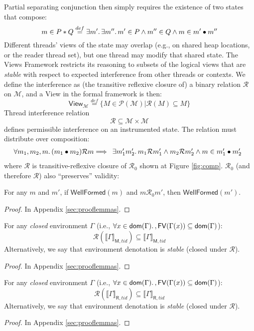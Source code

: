 Partial separating conjunction then simply requires the existence of two states that compose:
\[ m \in P \ast Q   \stackrel{def}{=} \exists m' \ldotp \exists m'' \ldotp m' \in P \land m'' \in Q \land m \in m' \bullet m''\]
Different threads' views of the state may overlap (e.g., on shared heap locations, or the reader thread set), but one thread may modify that shared state.  The Views Framework restricts its reasoning to subsets of the logical views that are \emph{stable} with respect to expected interference from other threads or contexts.  We define the interference as (the transitive reflexive closure of) a binary relation $\mathcal{R}$ on $\mathcal{M}$, and a \textsf{View} in the formal framework is then:
\[\textsf{View}_{\mathcal{M}} \stackrel{def}{=} \{ M \in \mathcal{P}(\mathcal{M}) | \mathcal{R}(M) \subseteq M\}\]
Thread interference relation
\[\mathcal{R} \subseteq \mathcal{M} \times \mathcal{M}\]  defines permissible interference on an instrumented state. The relation must distribute over composition:
\[ \forall m_{1}, m_{2}, m\ldotp (m_{1} \bullet  m_{2})\mathcal{R}m \Longrightarrow \begin{array}{ll}  \exists  m'_{1} m'_{2} \ldotp m_{1} \mathcal{R} m'_{1} \land m_{2} \mathcal{R} m'_{2} \land  m \in m'_{1} \bullet m'_{2} \end{array}\]
where $\mathcal{R}$ is transitive-reflexive closure of $\mathcal{R}_{0}$ shown at Figure \ref{fig:comp}. $\mathcal{R}_0$ (and therefore $\mathcal{R}$) also ``preserves'' validity:
\begin{lemma}
For any $m$ and $m'$, if $\mathsf{WellFormed}(m)$ and $m\mathcal{R}_0m'$, then $\mathsf{WellFormed}(m')$.
\end{lemma}
\begin{proof}
In Appendix \ref{sec:prooflemmas}.
\end{proof}
\begin{lemma}\label{lemma:stblw}
For any \emph{closed} environment $\Gamma$ (i.e., $\forall x\in\mathsf{dom}(\Gamma)\ldotp, \mathsf{FV}(\Gamma(x))\subseteq\mathsf{dom}(\Gamma)$):
\[
\mathcal{R}(\llbracket\Gamma\rrbracket_{\mathsf{M},tid})\subseteq\llbracket\Gamma\rrbracket_{\mathsf{M},tid}
\]
Alternatively, we say that environment denotation is \emph{stable} (closed under $\mathcal{R}$).
\end{lemma}
\begin{proof}
In Appendix \ref{sec:prooflemmas}.
\end{proof}
\begin{lemma}
For any \emph{closed} environment $\Gamma$ (i.e., $\forall x\in\mathsf{dom}(\Gamma)\ldotp, \mathsf{FV}(\Gamma(x))\subseteq\mathsf{dom}(\Gamma)$):
\[
\mathcal{R}(\llbracket\Gamma\rrbracket_{\mathsf{R},tid})\subseteq\llbracket\Gamma\rrbracket_{\mathsf{R},tid}
\]
Alternatively, we say that environment denotation is \emph{stable} (closed under $\mathcal{R}$).
\end{lemma}
\begin{proof}
In Appendix \ref{sec:prooflemmas}.
\end{proof}

